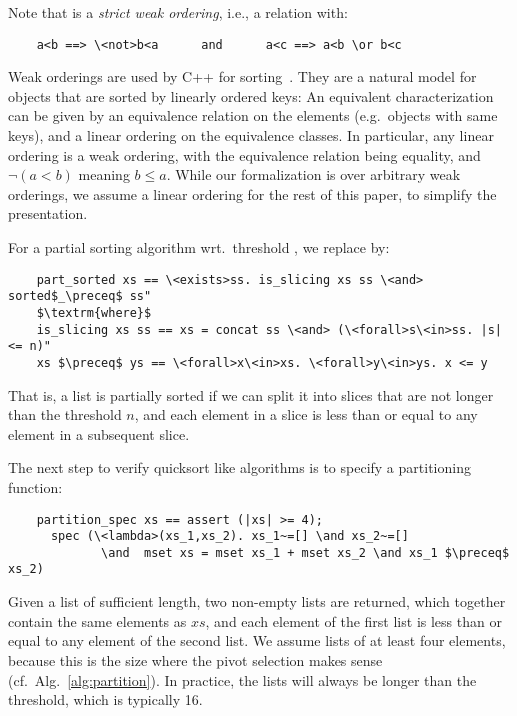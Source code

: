 \documentclass[sigplan,10pt,anonymous,review]{acmart}\settopmatter{printfolios=true,printccs=false,printacmref=false}
\theoremstyle{definition}
\begin{document}
  Note that \is{<} is a \emph{strict weak ordering}, i.e., a relation with:
  \begin{lstlisting}
    a<b ==> \<not>b<a      and      a<c ==> a<b \or b<c
  \end{lstlisting}
  Weak orderings are used by C++ for sorting~\cite{Josu12}.
  They are a natural model for objects that are sorted by linearly ordered keys:
  An equivalent characterization can be given by an equivalence relation on the elements (e.g.~objects with same keys),
  and a linear ordering on the equivalence classes.
  In particular, any linear ordering is a weak ordering, with the equivalence relation being equality, and
  $\neg (a<b)$ meaning $b\le a$. While our formalization is over arbitrary weak orderings, we assume a linear ordering for the rest of
  this paper, to simplify the presentation.

  For a partial sorting algorithm wrt.\ threshold , we replace  by:
  \begin{lstlisting}
    part_sorted xs == \<exists>ss. is_slicing xs ss \<and> sorted$_\preceq$ ss"
    $\textrm{where}$
    is_slicing xs ss == xs = concat ss \<and> (\<forall>s\<in>ss. |s| <= n)"
    xs $\preceq$ ys == \<forall>x\<in>xs. \<forall>y\<in>ys. x <= y
  \end{lstlisting}
  That is, a list is partially sorted if we can split it into slices that are not longer than
  the threshold $n$, and each element in a slice is less than or equal to any element in a subsequent slice.

  The next step to verify quicksort like algorithms is to specify a partitioning function:
  \begin{lstlisting}
    partition_spec xs == assert (|xs| >= 4);
      spec (\<lambda>(xs_1,xs_2). xs_1~=[] \and xs_2~=[]
             \and  mset xs = mset xs_1 + mset xs_2 \and xs_1 $\preceq$ xs_2)
  \end{lstlisting}
  Given a list  of sufficient length, two non-empty lists  are returned,
  which together contain the same elements as $xs$, and each element of the first list is less than or equal to any element of the second list.
  We assume lists of at least four elements, because this is the size where the pivot selection makes sense (cf.~Alg.~\ref{alg:partition}).
  In practice, the lists will always be longer than the threshold, which is typically 16.
\end{document}

